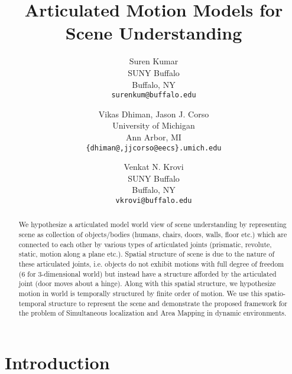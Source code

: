 \documentclass[10pt,twocolumn,letterpaper]{article}
\begin{document}
\title{Articulated Motion Models for Scene Understanding}

\author{Suren Kumar\\
SUNY Buffalo \\
Buffalo, NY \\
{\tt\small surenkum@buffalo.edu}
\and
Vikas Dhiman, Jason J. Corso\\
University of Michigan\\
Ann Arbor, MI\\
{\tt\small \{dhiman@,jjcorso@eecs\}.umich.edu}
\and
Venkat N. Krovi\\
SUNY Buffalo \\
Buffalo, NY \\
{\tt\small vkrovi@buffalo.edu}}

\maketitle

\begin{abstract}
We hypothesize a articulated model world view of scene understanding by representing scene as collection of objects/bodies (humans, chairs, doors, walls, floor etc.) which are connected to each other by various types of articulated joints (prismatic, revolute, static, motion along a plane etc.). Spatial structure of scene is due to the nature of these articulated joints, i.e. objects do not exhibit motions with full degree of freedom (6 for 3-dimensional world) but instead have a structure afforded by the articulated joint (door moves about a hinge). Along with this spatial structure, we hypothesize motion in world is temporally structured by finite order of motion. We use this spatio-temporal structure to represent the scene and demonstrate the proposed framework for the problem of Simultaneous localization and Area Mapping in dynamic environments.
\end{abstract}

\section{Introduction}
\end{document}
